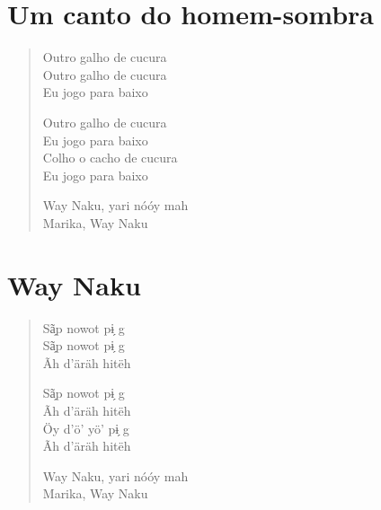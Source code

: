 \endgroup

\chapter{Um canto do homem-sombra}

\begin{verse}
Outro galho de cucura\\
Outro galho de cucura\\
Eu jogo para baixo

Outro galho de cucura\\
Eu jogo para baixo\\
Colho o cacho de cucura\\
Eu jogo para baixo

Way Naku, yari nóóy mah\\
Marika, Way Naku
\end{verse}

\chapter{Way Naku}

\begin{verse}
Sã̗p nowot pɨ̗ g\\
Sã̗p nowot pɨ̗ g\\
Ãh d’äräh hitëh

Sã̗p nowot pɨ̗ g\\
Ãh d’äräh hitëh\\
Öy d’ö’ yö’ pɨ̗ g\\
Ãh d’äräh hitëh

Way Naku, yari nóóy mah\\
Marika, Way Naku
\end{verse}


